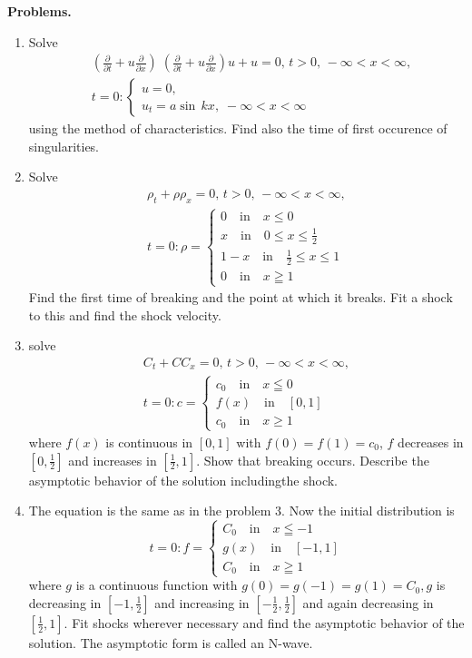 {\bf \large Problems.}\pageoriginale
\begin{enumerate}
\item Solve
\begin{align*}
&\left(\frac{\partial}{\partial t}+u\frac{\partial}{\partial x}\right)\; \left(\frac{\partial}{\partial t}+u\frac{\partial}{\partial x}\right)u+u=0, \,t>0, \, -\infty < x < \infty,\\
& t=0:
\begin{cases}
u=0,\\
u_t=a\sin \,kx, \; -\infty < x < \infty
\end{cases}
\end{align*}
using the method of characteristics. Find also the time of first occurence of singularities.
\item Solve 
\begin{gather*}
\rho_t+\rho\rho_x=0, \, t>0, \, -\infty < x < \infty,\\
t=0:\rho=
\begin{cases}
0\quad\text{in}\quad x\leq 0\\
x\quad\text{in}\quad 0\leq x \leq\frac{1}{2}\\
1-x\quad\text{in}\quad \frac{1}{2}\leq x\leq 1\\
0\quad\text{in}\quad x\geqq 1
\end{cases}
\end{gather*}
Find the first time of breaking and the point at which it breaks. Fit a shock to this and find the shock velocity.
\item solve 
\begin{gather*}
C_t+CC_x=0, \, t>0, \, -\infty < x < \infty,\\
t=0:c=
\begin{cases}
c_0\quad\text{in}\quad x\leqq 0\\
f(x)\quad\text{in}\quad [0,1]\\
c_0\quad\text{in} \quad x\geq 1
\end{cases}
\end{gather*}
where $f(x)$ is continuous in $[0,1]$ with $f(0)=f(1)=c_0$, $f$ decreases in $[0,\frac{1}{2}]$ and increases in $[\frac{1}{2},1]$. Show that breaking occurs. Describe the asymptotic behavior of the solution including\pageoriginale the shock.
\item The equation is the same as in the problem 3. Now the initial distribution is 
\begin{equation*}
t=0:f=
\begin{cases}
C_0\quad\text{in}\quad x\leqq -1\\
g(x)\quad\text{in}\quad [-1,1]\\
C_0\quad\text{in}\quad x\geqq 1
\end{cases}
\end{equation*}
where $g$ is a continuous function with $g(0)=g(-1)=g(1)=C_0, g$ is decreasing in $[-1,\frac{1}{2}]$ and increasing in $[-\frac{1}{2},\frac{1}{2}]$ and again decreasing in $[\frac{1}{2},1]$. Fit shocks wherever necessary and find the asymptotic behavior of the solution. The asymptotic form is called an N-wave.


\end{enumerate}
